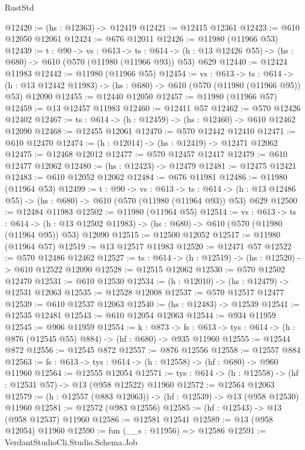 \begin{lexlean}{RustStd}
\begin{coremodule}
@12420 := (hs : @12363) -> @12419
@12421 := @12415 @12361
@12423 := @610 @12050 @12061
@12424 := @676 @12011
@12426 := @11980 (@11966 @53)
@12439 := {t : @90} ->
  {vs : @613} ->
  {ts : @614} -> (h : @13 @12426 @55) -> (hs : @680) -> @610 (@570 (@11980 (@11966 @93)) @53) @629
@12440 := @12424 @11983
@12442 := @11980 (@11966 @55)
@12454 := {vs : @613} ->
  {ts : @614} ->
  (h : @13 @12442 @11983) -> (hs : @680) -> @610 (@570 (@11980 (@11966 @95)) @53) @12090
@12455 := @12440 @12050
@12457 := @11980 (@11966 @57)
@12459 := @13 @12457 @11983
@12460 := @12411 @57
@12462 := @570 @12426 @12402
@12467 := {ts : @614} -> (h : @12459) -> (hs : @12460) -> @610 @12462 @12090
@12468 := @12455 @12061
@12470 := @570 @12442 @12410
@12471 := @610 @12470
@12474 := (h : @12014) -> (hs : @12419) -> @12471 @12062
@12475 := @12468 @12012
@12477 := @570 @12457 @12417
@12479 := @610 @12477 @12062
@12480 := (hs : @12423) -> @12479
@12481 := @12475 @12421
@12483 := @610 @12052 @12062
@12484 := @676 @11981
@12486 := @11980 (@11964 @53)
@12499 := {t : @90} ->
  {vs : @613} ->
  {ts : @614} -> (h : @13 @12486 @55) -> (hs : @680) -> @610 (@570 (@11980 (@11964 @93)) @53) @629
@12500 := @12484 @11983
@12502 := @11980 (@11964 @55)
@12514 := {vs : @613} ->
  {ts : @614} ->
  (h : @13 @12502 @11983) -> (hs : @680) -> @610 (@570 (@11980 (@11964 @95)) @53) @12090
@12515 := @12500 @12052
@12517 := @11980 (@11964 @57)
@12519 := @13 @12517 @11983
@12520 := @12471 @57
@12522 := @570 @12486 @12462
@12527 := {ts : @614} -> (h : @12519) -> (hs : @12520) -> @610 @12522 @12090
@12528 := @12515 @12062
@12530 := @570 @12502 @12470
@12531 := @610 @12530
@12534 := (h : @12010) -> (hs : @12479) -> @12531 @12063
@12535 := @12528 @12008
@12537 := @570 @12517 @12477
@12539 := @610 @12537 @12063
@12540 := (hs : @12483) -> @12539
@12541 := @12535 @12481
@12543 := @610 @12054 @12063
@12544 := @934 @11959
@12545 := @906 @11959
@12554 := {k : @873} ->
  {fs : @613} -> {tys : @614} -> (h : @876 (@12545 @55) @884) -> (hf : @680) -> @935 @11960
@12555 := @12544 @872
@12556 := @12545 @872
@12557 := @876 @12556
@12558 := @12557 @884
@12563 := {fs : @613} -> {tys : @614} -> (h : @12558) -> (hf : @680) -> @960 @11960
@12564 := @12555 @12054
@12571 := {tys : @614} -> (h : @12558) -> (hf : @12531 @57) -> @13 (@958 @12522) @11960
@12572 := @12564 @12063
@12579 := (h : @12557 (@883 @12063)) -> (hf : @12539) -> @13 (@958 @12530) @11960
@12581 := @12572 (@983 @12556)
@12585 := (hf : @12543) -> @13 (@958 @12537) @11960
@12586 := @12581 @12541
@12589 := @13 (@958 @12054) @11960
@12590 := fun (__s : @11956) => @12586
@12591 := VerdantStudioCli.Studio.Schema.Job

\end{coremodule}
\end{lexlean}
